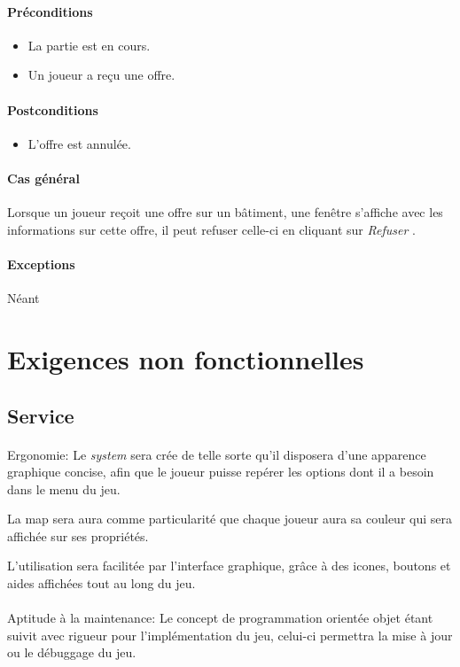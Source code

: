 \documentclass[a4paper,11pt]{report}
\begin{document}
\paragraph{Préconditions}
\begin{itemize}
 \item La partie est en cours.
 \item Un joueur a reçu une offre.
\end{itemize}
\paragraph{Postconditions}
\begin{itemize}
 \item L'offre est annulée.
\end{itemize}
\paragraph{Cas général}
Lorsque un joueur reçoit une offre sur un bâtiment, une fenêtre s'affiche avec les informations sur cette offre, il peut refuser celle-ci en cliquant sur \og \textit{Refuser} \fg.
\paragraph{Exceptions} Néant

\newpage
\section{Exigences non fonctionnelles}
\subsection{Service}
\paragraph{}Ergonomie:  \newline
Le \textit{system} sera crée de telle sorte qu'il disposera d’une apparence graphique concise, afin que le joueur puisse repérer les options dont il a besoin dans le menu du jeu.

La map sera aura comme particularité que chaque joueur aura sa couleur qui sera affichée sur ses propriétés.

L'utilisation sera facilitée par l'interface graphique, grâce à des icones, boutons et aides affichées tout au long du jeu.

\paragraph{}Aptitude à la maintenance:  \newline
Le concept de programmation orientée objet étant suivit avec rigueur pour l’implémentation du jeu, celui-ci permettra la mise à jour ou le débuggage du jeu.
\end{document}
